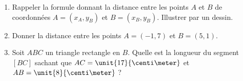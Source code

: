 
\begin{exercice}\label{exosmath-0026}

    \begin{enumerate}
        \item
            Rappeler la formule donnant la distance entre les points \( A\) et \( B\) de coordonnées \( A=(x_A,y_B)\) et \( B=(x_B,y_B)\). Illustrer par un dessin.
        \item
            Donner la distance entre les points \( A=(-1,7)\) et \( B=(5,1)\).
        \item
            Soit \( ABC\) un triangle rectangle en \( B\). Quelle est la longueur du segment \( [BC]\) sachant que \( AC=\unit{17}{\centi\meter}\) et \( AB=\unit{8}{\centi\meter}\) ?
    \end{enumerate}

\end{exercice}
